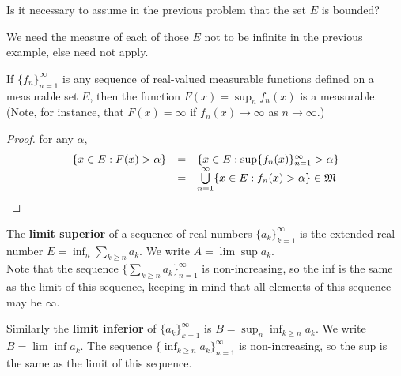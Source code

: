 \begin{pblm}%
	Is it necessary to assume in the previous problem that the set $E$ is 
	bounded? 

	We need the measure of each of those $E$ not to be infinite 
	in the previous example, else  need not apply. 
\end{pblm}

\begin{pblm}%
	If $\{f_n\}_{n=1}^\infty$ is any sequence of real-valued measurable 
	functions defined on a measurable set $E$, then the function 
	$F(x) = \sup_n f_n(x)$ is a measurable. (Note, for instance, that 
	$F(x) = \infty$ if $f_n(x) \rightarrow \infty$ as $n \rightarrow \infty$.)
\begin{proof}
	for any $\alpha$, 
	\begin{equation*}
	\begin{array}{rcl}
		\{x \in E: F(x) > \alpha\} &=& \{x \in E: \sup \{f_n(x)\}_{n=1}^\infty > \alpha\}\\
		&=& \bigcup\limits_{n=1}^\infty\{x\in E: f_n(x) > \alpha\} \in \mathfrak{M}
	\end{array}
	\end{equation*}
\end{proof}
\end{pblm}

\begin{defn}\label{d:limsup}%
	The \textbf{limit superior} of a sequence of real numbers 
	$\{a_k\}_{k=1}^\infty$ is the extended real number 
	$E = \inf_n \sum_{k\ge n} a_k$. We write $A = \lim\sup a_k$. \\
	Note that the sequence $\{\sum_{k\ge n}a_k\}_{n=1}^\infty$ is 
	non-increasing, so the inf is the same as the limit of this sequence, 
	keeping in mind that all elements of this sequence may be $\infty$. 

	Similarly the \textbf{limit inferior} of $\{a_k\}_{k=1}^\infty$ is 
	$B = \sup_n\inf_{k\ge n}a_k$. We write $B = \lim\inf a_k$. The sequence 
	$\{\inf_{k\ge n}a_k\}_{n=1}^\infty$ is non-increasing, so the sup is the 
	same as the limit of this sequence. 
\end{defn}

